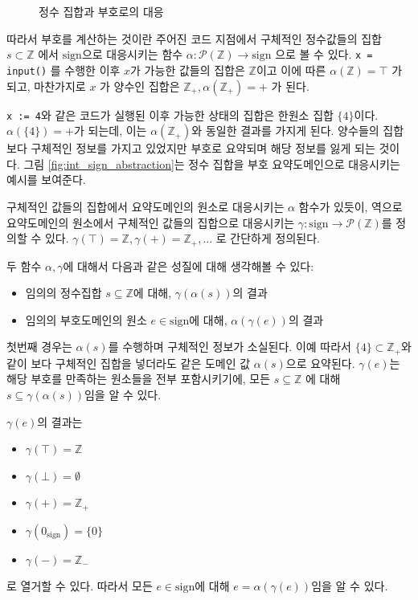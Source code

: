 \documentclass[a4paper,12pt]{article}
\begin{document}
\begin{figure}[h]
    \centering
    
    \caption{정수 집합과 부호로의 대응}
    \label{fig:int_sign_galois}
\end{figure}

따라서 부호를 계산하는 것이란 주어진 코드 지점에서 구체적인 정수값들의 집합 $s \subset \mathbb{Z}$ 에서 $\mathrm{sign}$으로 대응시키는 함수 $\alpha : \mathcal{P}(\mathbb{Z}) \rightarrow \mathrm{sign}$ 으로 볼 수 있다.
\verb|x = input()| 를 수행한 이후 $x$가 가능한 값들의 집합은 $\mathbb{Z}$이고 이에 따른 $\alpha(\mathbb{Z}) = \top$ 가 되고, 마찬가지로 $x$ 가 양수인 집합은 $\mathbb{Z}_{+}, \alpha (\mathbb{Z}_{+}) = +$ 가 된다.

\verb|x := 4|와 같은 코드가 실행된 이후 가능한 상태의 집합은 한원소 집합 $\{4\}$이다. $\alpha(\{4\}) = +$가 되는데, 이는 $\alpha(\mathbb{Z}_{+})$와 동일한 결과를 가지게 된다. 
양수들의 집합보다 구체적인 정보를 가지고 있었지만 부호로 요약되며 해당 정보를 잃게 되는 것이다. 그림 \ref{fig:int_sign_abstraction}는 정수 집합을 부호 요약도메인으로 대응시키는 예시를 보여준다.

구체적인 값들의 집합에서 요약도메인의 원소로 대응시키는 $\alpha$ 함수가 있듯이, 역으로 요약도메인의 원소에서 구체적인 값들의 집합으로 대응시키는 $\gamma: \mathrm{sign} \rightarrow \mathcal{P}(\mathbb{Z})$를 정의할 수 있다. $\gamma(\top) = \mathbb{Z}, \gamma(+) = \mathbb{Z}_{+}, \ldots$ 로 간단하게 정의된다.

두 함수 $\alpha, \gamma$에 대해서 다음과 같은 성질에 대해 생각해볼 수 있다:

\begin{itemize}
    \item 임의의 정수집합 $s \subseteq \mathbb{Z}$에 대해, $\gamma(\alpha(s))$의 결과
    \item 임의의 부호도메인의 원소 $e \in \mathrm{sign}$에 대해, $\alpha(\gamma(e))$의 결과
\end{itemize}

첫번째 경우는 $\alpha(s)$를 수행하며 구체적인 정보가 소실된다. 이예 따라서 $\{4\} \subset \mathbb{Z}_{+}$와 같이 보다 구체적인 집합을 넣더라도 같은 도메인 값 $\alpha(s)$으로 요약된다. 
$\gamma(e)$는 해당 부호를 만족하는 원소들을 전부 포함시키기에, 모든 $s \subseteq \mathbb{Z}$ 에 대해 $s \subseteq \gamma(\alpha(s))$임을 알 수 있다.\cite{cousot1977}

$\gamma(e)$의 결과는
\begin{itemize}
    \item $\gamma(\top) = \mathbb{Z}$
    \item $\gamma(\bot) = \emptyset$
    \item $\gamma(+) = \mathbb{Z}_{+}$
    \item $\gamma(0_{\mathrm{sign}}) = \{0\}$
    \item $\gamma(-) = \mathbb{Z}_{-}$
\end{itemize}
로 열거할 수 있다. 따라서 모든 $e \in \mathrm{sign}$에 대해 $e = \alpha(\gamma(e))$임을 알 수 있다.
\end{document}
